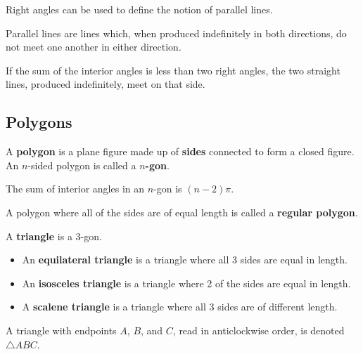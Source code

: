 Right angles can be used to define the notion of parallel lines.
\begin{definition}
    Parallel lines are lines which, when produced indefinitely in both directions, do not meet one another in either direction.
\end{definition}

\begin{axiom}
    If the sum of the interior angles is less than two right angles, the two straight lines, produced indefinitely, meet on that side.
\end{axiom}

\subsection{Polygons}
\begin{definition}
    A \textbf{polygon} is a plane figure made up of \textbf{sides} connected to form a closed figure. An $n$-sided polygon is called a \textbf{$n$-gon}.
\end{definition}

\begin{proposition}
    The sum of interior angles in an $n$-gon is $(n-2)\pi$.
\end{proposition}

\begin{definition}
    A polygon where all of the sides are of equal length is called a \textbf{regular polygon}.
\end{definition}

\begin{definition}
    A \textbf{triangle} is a 3-gon.
    \begin{itemize}
        \item An \textbf{equilateral triangle} is a triangle where all 3 sides are equal in length.
        \item An \textbf{isosceles triangle} is a triangle where 2 of the sides are equal in length.
        \item A \textbf{scalene triangle} is a triangle where all 3 sides are of different length.
    \end{itemize}
    A triangle with endpoints $A$, $B$, and $C$, read in anticlockwise order, is denoted $\triangle ABC$.
\end{definition}

